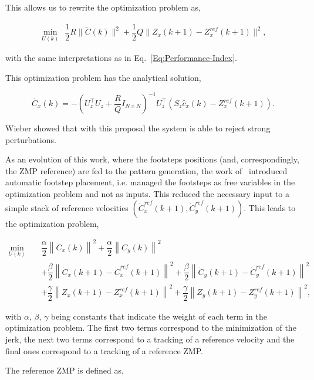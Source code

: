 This allows us to rewrite the optimization problem as,

\begin{eqnarray}
\nonumber
\underset{U(k)}{\min} ~~ \dfrac{1}{2} R \| \dddot{{C}}(k) \|^2 + \dfrac{1}{2} Q \|{Z}_x(k+1) - {Z}^{ref}_x(k+1) \|^2,
\end{eqnarray}
 
with the same interpretations as in Eq.~\ref{Eq:Performance-Index}.

This optimization problem has the analytical solution,

\begin{equation}
\dddot{{C}}_x(k) = -({U}_z^{\top} {U}_z + \dfrac{R}{Q} {I}_{N \times N})^{-1} {U}_z^{\top}({S}_z \hat{c}_x(k) - {Z}_x^{ref}(k+1)).
\end{equation}

Wieber showed that with this proposal the system is able to reject strong perturbations.

As an evolution of this work, where the footsteps positions (and, correspondingly, the ZMP reference) are fed to the pattern generation, the work of~\citep{HerdtAR2010} introduced automatic footstep placement, i.e. managed the footsteps as free variables in the optimization problem and not as inputs. This reduced the necessary input to a simple stack of reference velocities $(\dot{C}_{x}^{ref}(k+1),\dot{C}_{y}^{ref}(k+1))$. This leads to the optimization problem,

\begin{eqnarray}
\nonumber
 \underset{U(k)}{\min} \; && \dfrac{\alpha}{2} \left\| \dddot{C}_x(k) \right\|^2 + \dfrac{\alpha}{2} \left\| \dddot{C}_y(k) \right\|^2 \\
&& + \dfrac{\beta}{2} \left\| \dot{C}_{x}(k+1) - \dot{C}_{x}^{ref}(k+1) \right\|^2 + \dfrac{\beta}{2} \left\| \dot{C}_{y}(k+1) - \dot{C}_{y}^{ref}(k+1) \right\|^2  \nonumber \\
&& + \dfrac{\gamma}{2} \left\| Z_x(k+1) - Z_x^{ref}(k+1) \right\|^2 + \dfrac{\gamma}{2} \left\| Z_y(k+1) - Z_y^{ref}(k+1) \right\|^2,
\label{Eq:MinJerk}
\end{eqnarray}

with $\alpha$, $\beta$, $\gamma$ being constants that indicate the weight of each term in the optimization problem. The first two terms correspond to the minimization of the jerk, the next two terms correspond to a tracking of a reference velocity and the final ones correspond to a tracking of a reference ZMP.

The reference ZMP is defined as,

